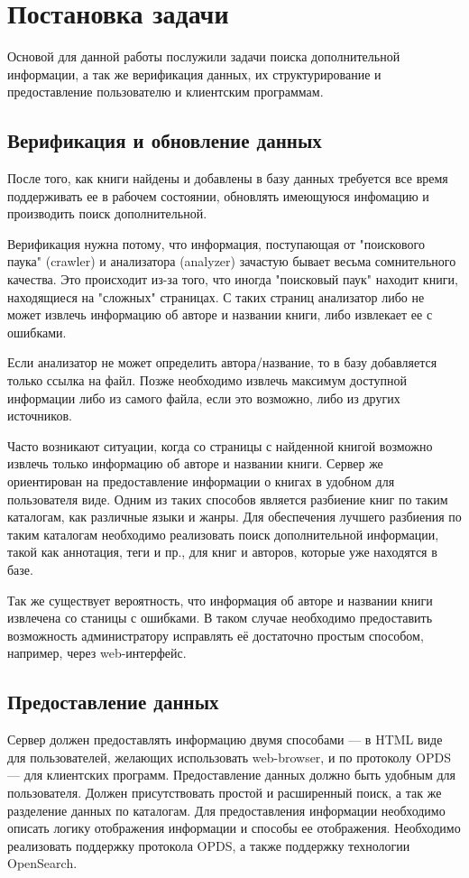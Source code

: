 \section{Постановка задачи}

Основой для данной работы послужили задачи поиска дополнительной информации, а так же верификация данных, их структурирование  и предоставление пользователю и клиентским программам.


\subsection{Верификация и обновление данных}

После того, как книги найдены и добавлены в базу данных требуется все время поддерживать ее в рабочем состоянии, обновлять имеющуюся инфомацию и производить поиск дополнительной.

Верификация нужна потому, что информация, поступающая от "поискового паука" (crawler) и анализатора (analyzer) зачастую бывает весьма сомнительного качества. Это происходит из-за того, что иногда "поисковый паук" находит книги, находящиеся на "сложных" страницах. С таких страниц анализатор либо не может извлечь информацию об авторе и названии книги, либо извлекает ее с ошибками. 

Если анализатор не может определить автора/название, то в базу добавляется только ссылка на файл. Позже необходимо извлечь максимум доступной информации либо из самого файла, если это возможно, либо из других источников.

Часто возникают ситуации, когда со страницы с найденной книгой возможно извлечь только информацию об авторе и названии книги. Сервер же ориентирован на предоставление информации о книгах в удобном для пользователя виде. Одним из таких способов является разбиение книг по таким каталогам, как различные языки и жанры. Для обеспечения лучшего разбиения по таким каталогам необходимо реализовать поиск дополнительной информации, такой как аннотация, теги и пр., для книг и авторов, которые уже находятся в базе.


Так же существует вероятность, что информация об авторе и названии книги извлечена со станицы с ошибками. В таком случае необходимо предоставить возможность администратору исправлять её достаточно простым способом, например, через web-интерфейс.


\subsection{Предоставление данных}

Сервер должен предоставлять информацию двумя способами --- в HTML виде для пользователей, желающих использовать web-browser, и по протоколу OPDS --- для клиентских программ. Предоставление данных должно быть удобным для пользователя. Должен присутствовать простой и расширенный поиск, а так же разделение данных по каталогам. Для предоставления информации необходимо описать логику отображения информации и способы ее отображения. Необходимо реализовать поддержку протокола OPDS, а также поддержку технологии OpenSearch.

\newpage
